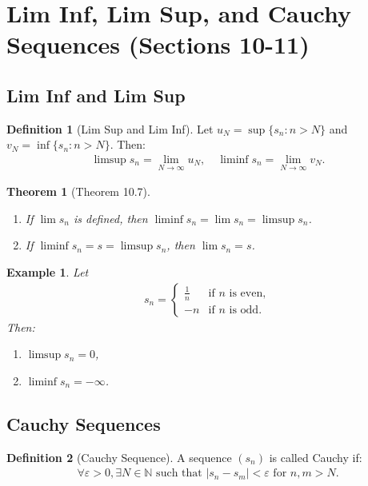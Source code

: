 \documentclass[9pt]{article}
\theoremstyle{definition}
\newtheorem{definition}{Definition}
\theoremstyle{plain}
\newtheorem{theorem}{Theorem}
\newtheorem{example}{Example}
\begin{document}
\section*{Lim Inf, Lim Sup, and Cauchy Sequences (Sections 10-11)}

\subsection*{Lim Inf and Lim Sup}
\begin{definition}[Lim Sup and Lim Inf]
Let $ u_N = \sup\{s_n : n > N\} $ and $ v_N = \inf\{s_n : n > N\} $. Then:
\begin{align}
\limsup s_n = \lim_{N \to \infty} u_N, \quad \liminf s_n = \lim_{N \to \infty} v_N.
\end{align}
\end{definition}

\begin{theorem}[Theorem 10.7]

\begin{enumerate}
    \item If $ \lim s_n $ is defined, then $ \liminf s_n = \lim s_n = \limsup s_n $.
    \item If $ \liminf s_n = s = \limsup s_n $, then $ \lim s_n = s $.
\end{enumerate}
\end{theorem}

\begin{example}
Let \begin{align}
    s_n = 
\begin{cases} 
\frac{1}{n} & \text{if } n \text{ is even}, \\
-n & \text{if } n \text{ is odd}.
\end{cases}
\end{align} 
Then:
\begin{enumerate}
    \item $ \limsup s_n = 0 $,
    \item $ \liminf s_n = -\infty $.
\end{enumerate}
\end{example}

\subsection*{Cauchy Sequences}
\begin{definition}[Cauchy Sequence]
A sequence $ (s_n) $ is called Cauchy if:
\begin{align}
\forall \varepsilon > 0, \exists N \in \mathbb{N} \text{ such that } |s_n - s_m| < \varepsilon \text{ for } n, m > N.
\end{align}
\end{definition}
\end{document}
